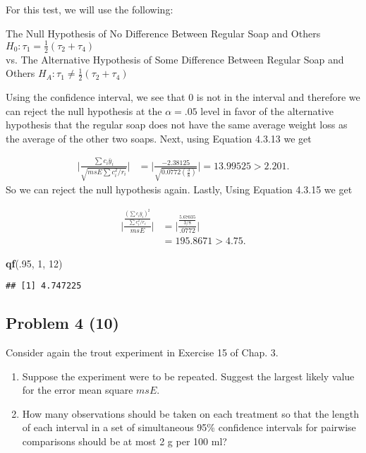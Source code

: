 \documentclass[12pt,]{article}
\newenvironment{Shaded}{\begin{snugshade}}{\end{snugshade}}
\newcommand{\KeywordTok}[1]{\textcolor[rgb]{0.13,0.29,0.53}{\textbf{#1}}}
\newcommand{\DecValTok}[1]{\textcolor[rgb]{0.00,0.00,0.81}{#1}}
\newcommand{\NormalTok}[1]{#1}
\begin{document}
For this test, we will use the following:

\begin{center}
 The Null Hypothesis of No Difference Between Regular Soap and Others  $H_0 : \tau_1 = \frac{1}{2}(\tau_2+ \tau_4)$ \\
 vs. The Alternative Hypothesis of Some Difference Between Regular Soap and Others $H_A : \tau_1 \neq \frac{1}{2}(\tau_2+ \tau_4)$
\end{center}

Using the confidence interval, we see that 0 is not in the interval and
therefore we can reject the null hypothesis at the \(\alpha=.05\) level
in favor of the alternative hypothesis that the regular soap does not
have the same average weight loss as the average of the other two soaps.
Next, using Equation 4.3.13 we get

\[
 \begin{aligned}
 \Bigg| \frac{\sum c_i \bar{y}_i}{\sqrt{msE \sum c_i^2/r_i}}  \Bigg|
 &=  \Bigg| \frac{-2.38125}{\sqrt{0.0772 \left( \frac{3}{8} \right)}}  \Bigg| = 13.99525 > 2.201.
  \end{aligned}
 \] So we can reject the null hypothesis again. Lastly, Using Equation
4.3.15 we get

\[
 \begin{aligned}
 \Bigg| \frac{ \frac{\left(\sum c_i \bar{y}_i\right)^2}{\sum c_i^2/r_i} }{ msE }  \Bigg|
 &=   \Bigg| \frac{ \frac{5.67035 }{3/8} }{ .0772 }  \Bigg|\\
 &=195.8671 > 4.75.
  \end{aligned}
 \]

\begin{Shaded}
\begin{Highlighting}[]
\KeywordTok{qf}\NormalTok{(.}\DecValTok{95}\NormalTok{, }\DecValTok{1}\NormalTok{, }\DecValTok{12}\NormalTok{)}
\end{Highlighting}
\end{Shaded}

\begin{verbatim}
## [1] 4.747225
\end{verbatim}

\subsection{Problem 4 (10)}\label{problem-4-10}

Consider again the trout experiment in Exercise 15 of Chap. 3.

\begin{enumerate}
\def\labelenumi{(\alph{enumi})}
\item
  Suppose the experiment were to be repeated. Suggest the largest likely
  value for the error mean square \(msE\).
\item
  How many observations should be taken on each treatment so that the
  length of each interval in a set of simultaneous 95\% confidence
  intervals for pairwise comparisons should be at most 2 g per 100 ml?
\end{enumerate}
\end{document}
